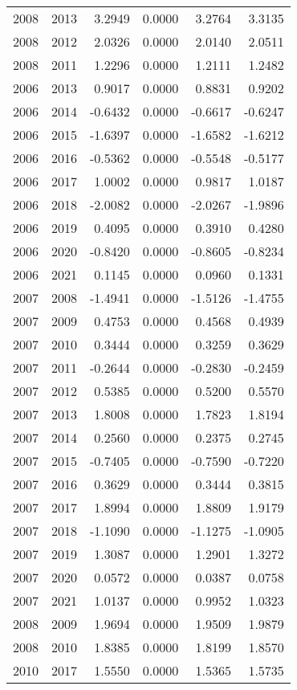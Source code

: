 \begin{tabular}{llrrrr}
2008 & 2013 & 3.2949 & 0.0000 & 3.2764 & 3.3135 \\
2008 & 2012 & 2.0326 & 0.0000 & 2.0140 & 2.0511 \\
2008 & 2011 & 1.2296 & 0.0000 & 1.2111 & 1.2482 \\
2006 & 2013 & 0.9017 & 0.0000 & 0.8831 & 0.9202 \\
2006 & 2014 & -0.6432 & 0.0000 & -0.6617 & -0.6247 \\
2006 & 2015 & -1.6397 & 0.0000 & -1.6582 & -1.6212 \\
2006 & 2016 & -0.5362 & 0.0000 & -0.5548 & -0.5177 \\
2006 & 2017 & 1.0002 & 0.0000 & 0.9817 & 1.0187 \\
2006 & 2018 & -2.0082 & 0.0000 & -2.0267 & -1.9896 \\
2006 & 2019 & 0.4095 & 0.0000 & 0.3910 & 0.4280 \\
2006 & 2020 & -0.8420 & 0.0000 & -0.8605 & -0.8234 \\
2006 & 2021 & 0.1145 & 0.0000 & 0.0960 & 0.1331 \\
2007 & 2008 & -1.4941 & 0.0000 & -1.5126 & -1.4755 \\
2007 & 2009 & 0.4753 & 0.0000 & 0.4568 & 0.4939 \\
2007 & 2010 & 0.3444 & 0.0000 & 0.3259 & 0.3629 \\
2007 & 2011 & -0.2644 & 0.0000 & -0.2830 & -0.2459 \\
2007 & 2012 & 0.5385 & 0.0000 & 0.5200 & 0.5570 \\
2007 & 2013 & 1.8008 & 0.0000 & 1.7823 & 1.8194 \\
2007 & 2014 & 0.2560 & 0.0000 & 0.2375 & 0.2745 \\
2007 & 2015 & -0.7405 & 0.0000 & -0.7590 & -0.7220 \\
2007 & 2016 & 0.3629 & 0.0000 & 0.3444 & 0.3815 \\
2007 & 2017 & 1.8994 & 0.0000 & 1.8809 & 1.9179 \\
2007 & 2018 & -1.1090 & 0.0000 & -1.1275 & -1.0905 \\
2007 & 2019 & 1.3087 & 0.0000 & 1.2901 & 1.3272 \\
2007 & 2020 & 0.0572 & 0.0000 & 0.0387 & 0.0758 \\
2007 & 2021 & 1.0137 & 0.0000 & 0.9952 & 1.0323 \\
2008 & 2009 & 1.9694 & 0.0000 & 1.9509 & 1.9879 \\
2008 & 2010 & 1.8385 & 0.0000 & 1.8199 & 1.8570 \\
2010 & 2017 & 1.5550 & 0.0000 & 1.5365 & 1.5735 \\

\end{tabular}
